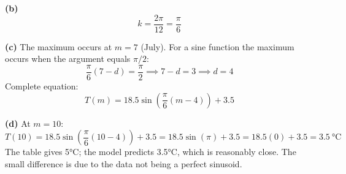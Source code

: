 \documentclass[addpoints]{exam}
\begin{document}
\begin{questions}
\begin{solution}
\textbf{(b)}
\[
k = \frac{2\pi}{12} = \frac{\pi}{6}
\]

\textbf{(c)} The maximum occurs at $m = 7$ (July). For a sine function the maximum occurs when the argument equals $\pi/2$:
\[
\frac{\pi}{6}(7 - d) = \frac{\pi}{2} \implies 7 - d = 3 \implies d = 4
\]
Complete equation:
\[
\boxed{T(m) = 18.5\sin\!\left(\frac{\pi}{6}(m - 4)\right) + 3.5}
\]

\textbf{(d)} At $m = 10$:
\[
T(10) = 18.5\sin\!\left(\frac{\pi}{6}(10-4)\right) + 3.5
       = 18.5\sin(\pi) + 3.5
       = 18.5(0) + 3.5 = 3.5\ \text{°C}
\]
The table gives 5°C; the model predicts 3.5°C, which is reasonably close. The small difference is due to the data not being a perfect sinusoid.
\end{solution}

\end{questions}
\end{document}
